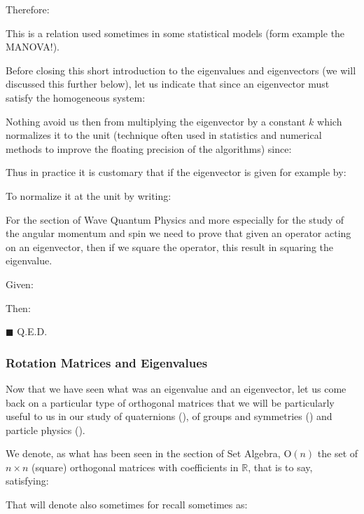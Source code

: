 	Therefore:
	
	This is a relation used sometimes in some statistical models (form example the MANOVA!). 
	
	Before closing this short introduction to the eigenvalues and eigenvectors (we will discussed this further below), let us indicate that since an eigenvector must satisfy the homogeneous system:
	
	Nothing avoid us then from multiplying the eigenvector by a constant $k$ which normalizes it to the unit (technique often used in statistics and numerical methods to improve the floating precision of the algorithms) since:
	
	Thus in practice it is customary that if the eigenvector is given for example by:
	
	To normalize it at the unit by writing:
	
	
	For the section of Wave Quantum Physics and more especially for the study of the angular momentum and spin we need to prove that given an operator acting on an eigenvector, then if we square the operator, this result in squaring the eigenvalue.
	\begin{dem}
	Given:
	
	Then:
	
	\begin{flushright}
		$\blacksquare$  Q.E.D.
	\end{flushright}
	\end{dem}
	
	\subsubsection{Rotation Matrices and Eigenvalues}\label{rotation matrix in linear algebra}
	Now that we have seen what was an eigenvalue and an eigenvector, let us come back on a particular type of orthogonal matrices that we will be particularly useful to us in our study of quaternions (), of groups and symmetries () and particle physics ().
	
	We denote, as what has been seen in the section of Set Algebra, $\text{O}(n)$ the set of $n\times n$ (square) orthogonal matrices with coefficients in $\mathbb{R}$, that is to say, satisfying:
	
	That will denote also sometimes for recall sometimes as:
	
